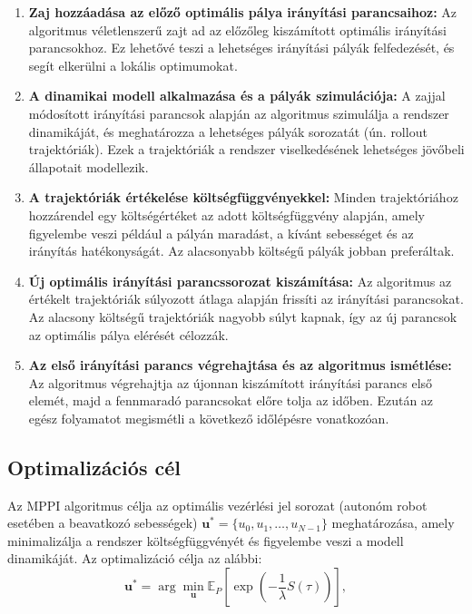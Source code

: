 \begin{enumerate}
    \item \textbf{Zaj hozzáadása az előző optimális pálya irányítási parancsaihoz:}
    Az algoritmus véletlenszerű zajt ad az előzőleg kiszámított optimális irányítási parancsokhoz. Ez lehetővé teszi a lehetséges irányítási pályák felfedezését, és segít elkerülni a lokális optimumokat.

    \item \textbf{A dinamikai modell alkalmazása és a pályák szimulációja:}
    A zajjal módosított irányítási parancsok alapján az algoritmus szimulálja a rendszer dinamikáját, és meghatározza a lehetséges pályák sorozatát (ún. rollout trajektóriák). Ezek a trajektóriák a rendszer viselkedésének lehetséges jövőbeli állapotait modellezik.

    \item \textbf{A trajektóriák értékelése költségfüggvényekkel:}
    Minden trajektóriához hozzárendel egy költségértéket az adott költségfüggvény alapján, amely figyelembe veszi például a pályán maradást, a kívánt sebességet és az irányítás hatékonyságát. Az alacsonyabb költségű pályák jobban preferáltak.

    \item \textbf{Új optimális irányítási parancssorozat kiszámítása:}
    Az algoritmus az értékelt trajektóriák súlyozott átlaga alapján frissíti az irányítási parancsokat. Az alacsony költségű trajektóriák nagyobb súlyt kapnak, így az új parancsok az optimális pálya elérését célozzák.

    \item \textbf{Az első irányítási parancs végrehajtása és az algoritmus ismétlése:}
    Az algoritmus végrehajtja az újonnan kiszámított irányítási parancs első elemét, majd a fennmaradó parancsokat előre tolja az időben. Ezután az egész folyamatot megismétli a következő időlépésre vonatkozóan.
\end{enumerate}

\subsection{Optimalizációs cél}
Az MPPI algoritmus célja az optimális vezérlési jel sorozat (autonóm robot esetében a beavatkozó sebességek) \( \mathbf{u}^* = \{u_0, u_1, \dots, u_{N-1}\} \) meghatározása, amely minimalizálja a rendszer költségfüggvényét és figyelembe veszi a modell dinamikáját. Az optimalizáció célja az alábbi:
\begin{equation}
\mathbf{u}^* = \arg\min_{\mathbf{u}} \mathbb{E}_P \left[ \exp\left(-\frac{1}{\lambda} S(\tau)\right) \right],
\end{equation}

